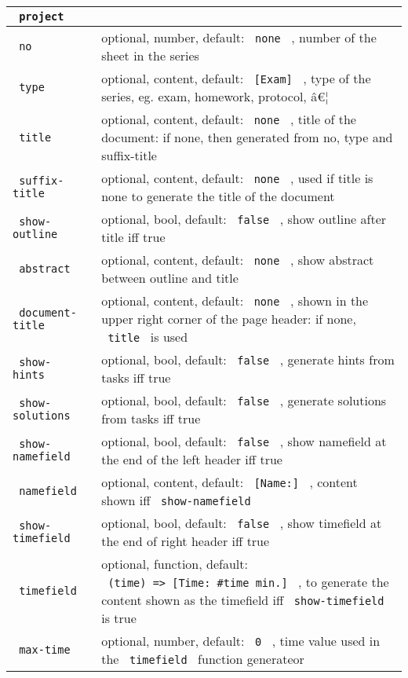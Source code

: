 \begin{longtable}[]{@{}ll@{}}
\toprule\noalign{}
\texttt{\ project\ } & \\
\midrule\noalign{}
\endhead
\bottomrule\noalign{}
\endlastfoot
\texttt{\ no\ } & optional, number, default: \texttt{\ none\ } , number
of the sheet in the series \\
\texttt{\ type\ } & optional, content, default: \texttt{\ {[}Exam{]}\ }
, type of the series, eg. exam, homework, protocol, â€¦ \\
\texttt{\ title\ } & optional, content, default: \texttt{\ none\ } ,
title of the document: if none, then generated from no, type and
suffix-title \\
\texttt{\ suffix-title\ } & optional, content, default:
\texttt{\ none\ } , used if title is none to generate the title of the
document \\
\texttt{\ show-outline\ } & optional, bool, default: \texttt{\ false\ }
, show outline after title iff true \\
\texttt{\ abstract\ } & optional, content, default: \texttt{\ none\ } ,
show abstract between outline and title \\
\texttt{\ document-title\ } & optional, content, default:
\texttt{\ none\ } , shown in the upper right corner of the page header:
if none, \texttt{\ title\ } is used \\
\texttt{\ show-hints\ } & optional, bool, default: \texttt{\ false\ } ,
generate hints from tasks iff true \\
\texttt{\ show-solutions\ } & optional, bool, default:
\texttt{\ false\ } , generate solutions from tasks iff true \\
\texttt{\ show-namefield\ } & optional, bool, default:
\texttt{\ false\ } , show namefield at the end of the left header iff
true \\
\texttt{\ namefield\ } & optional, content, default:
\texttt{\ {[}Name:{]}\ } , content shown iff
\texttt{\ show-namefield\ } \\
\texttt{\ show-timefield\ } & optional, bool, default:
\texttt{\ false\ } , show timefield at the end of right header iff
true \\
\texttt{\ timefield\ } & optional, function, default:
\texttt{\ (time)\ =\textgreater{}\ {[}Time:\ \#time\ min.{]}\ } , to
generate the content shown as the timefield iff
\texttt{\ show-timefield\ } is true \\
\texttt{\ max-time\ } & optional, number, default: \texttt{\ 0\ } , time
value used in the \texttt{\ timefield\ } function generateor \\

\end{longtable}
